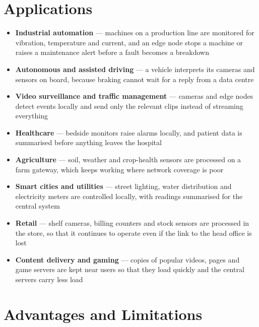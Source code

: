 \documentclass[../main.tex]{subfiles}
\begin{document}
\section{Applications}

\begin{itemize}
  \item \textbf{Industrial automation} --- machines on a production line are
        monitored for vibration, temperature and current, and an edge node
        stops a machine or raises a maintenance alert before a fault becomes
        a breakdown
  \item \textbf{Autonomous and assisted driving} --- a vehicle interprets its
        cameras and sensors on board, because braking cannot wait for a reply
        from a data centre~
  \item \textbf{Video surveillance and traffic management} --- cameras and
        edge nodes detect events locally and send only the relevant clips
        instead of streaming everything
  \item \textbf{Healthcare} --- bedside monitors raise alarms locally, and
        patient data is summarised before anything leaves the hospital
  \item \textbf{Agriculture} --- soil, weather and crop-health sensors are
        processed on a farm gateway, which keeps working where network
        coverage is poor
  \item \textbf{Smart cities and utilities} --- street lighting, water
        distribution and electricity meters are controlled locally, with
        readings summarised for the central system
  \item \textbf{Retail} --- shelf cameras, billing counters and stock sensors
        are processed in the store, so that it continues to operate even if
        the link to the head office is lost
  \item \textbf{Content delivery and gaming} --- copies of popular videos,
        pages and game servers are kept near users so that they load quickly
        and the central servers carry less load
\end{itemize}

\section{Advantages and Limitations}
\end{document}
